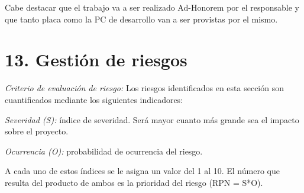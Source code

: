 \documentclass[
11pt, %
]{charter}
\begin{document}
Cabe destacar que el trabajo va a ser realizado Ad-Honorem por el responsable y que tanto placa como la PC de desarrollo van a ser provistas por el mismo.

\clearpage

\section{13. Gestión de riesgos}
\label{sec:riesgos}

\emph{Criterio de evaluación de riesgo:} Los riesgos identificados en esta sección son cuantificados mediante los siguientes indicadores:

\emph{Severidad (S):} índice de severidad. Será mayor cuanto más grande sea el impacto sobre el proyecto.

\emph{Ocurrencia (O):} probabilidad de ocurrencia del riesgo.

A cada uno de estos índices se le asigna un valor del 1 al 10. El número que resulta del producto de ambos es la prioridad del riesgo (RPN = S*O).
\end{document}
